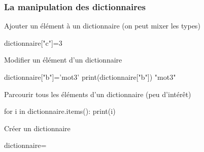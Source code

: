 \begin{frame}[fragile]
\frametitle{La manipulation des dictionnaires}

\begin{minipage}[t]{0.38\linewidth}
Ajouter un élément à un dictionnaire (on peut mixer les types)
\end{minipage}\hfill
\begin{minipage}[t]{0.58\linewidth}
\vspace{-0.5cm}
\begin{GrayBox}[0.85\textwidth]
\begin{verbatimtab}[3]
dictionnaire["c"]=3
\end{verbatimtab}
\end{GrayBox}
\end{minipage}

\begin{minipage}[t]{0.38\linewidth}
Modifier un élément d'un dictionnaire
\end{minipage}\hfill
\begin{minipage}[t]{0.58\linewidth}
\vspace{-0.5cm}
\begin{GrayBox}[0.85\textwidth]
\begin{verbatimtab}[3]
dictionnaire["b"]='mot3'
print(dictionnaire["b"])
	"mot3"
\end{verbatimtab}
\end{GrayBox}
\end{minipage}

\begin{minipage}[t]{0.38\linewidth}
Parcourir tous les éléments d'un dictionnaire (peu d'intérêt)
\end{minipage}\hfill
\begin{minipage}[t]{0.58\linewidth}
\vspace{-0.5cm}
\begin{GrayBox}[0.85\textwidth]
\begin{verbatimtab}[3]
for i in dictionnaire.items():
    print(i)
\end{verbatimtab}
\end{GrayBox}
\end{minipage}

\begin{minipage}[t]{0.38\linewidth}
Créer un dictionnaire
\end{minipage}\hfill
\begin{minipage}[t]{0.58\linewidth}
\vspace{-0.5cm}
\begin{GrayBox}[0.85\textwidth]
\begin{verbatimtab}[3]
dictionnaire={}
\end{verbatimtab}
\end{GrayBox}
\end{minipage}
\end{frame}


